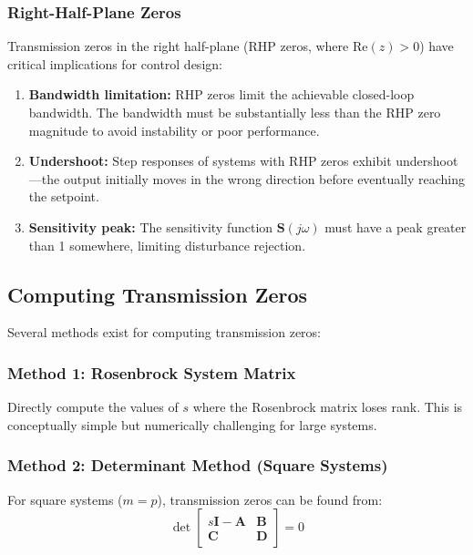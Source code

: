 \subsubsection{Right-Half-Plane Zeros}

Transmission zeros in the right half-plane (RHP zeros, where $\text{Re}(z) > 0$) have critical implications for control design:

\begin{enumerate}
\item \textbf{Bandwidth limitation:} RHP zeros limit the achievable closed-loop bandwidth. The bandwidth must be substantially less than the RHP zero magnitude to avoid instability or poor performance.

\item \textbf{Undershoot:} Step responses of systems with RHP zeros exhibit undershoot---the output initially moves in the wrong direction before eventually reaching the setpoint.

\item \textbf{Sensitivity peak:} The sensitivity function $\mathbf{S}(j\omega)$ must have a peak greater than 1 somewhere, limiting disturbance rejection.
\end{enumerate}


\subsection{Computing Transmission Zeros}

Several methods exist for computing transmission zeros:

\subsubsection{Method 1: Rosenbrock System Matrix}

Directly compute the values of $s$ where the Rosenbrock matrix loses rank. This is conceptually simple but numerically challenging for large systems.

\subsubsection{Method 2: Determinant Method (Square Systems)}

For square systems ($m = p$), transmission zeros can be found from:
\begin{equation}
\det\begin{bmatrix} s\mathbf{I} - \mathbf{A} & \mathbf{B} \\ \mathbf{C} & \mathbf{D} \end{bmatrix} = 0
\end{equation}

